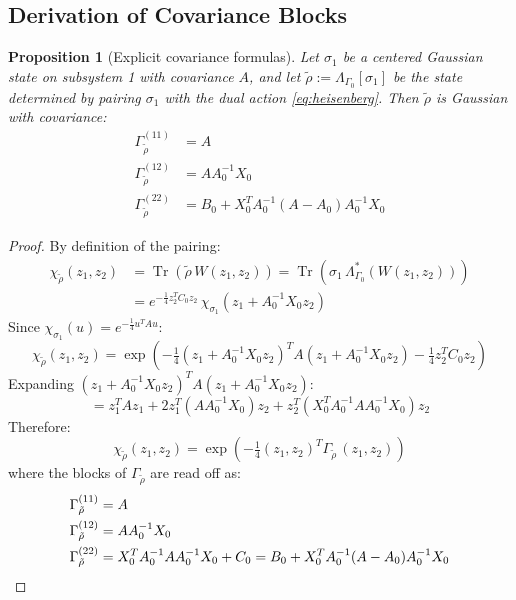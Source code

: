 \documentclass[11pt,a4paper]{article}
\theoremstyle{plain}
\newtheorem{proposition}[theorem]{Proposition}
\theoremstyle{definition}
\theoremstyle{remark}
\newcommand{\Tr}{\operatorname{Tr}}
\begin{document}
\subsection{Derivation of Covariance Blocks}

\begin{proposition}[Explicit covariance formulas]\label{prop:blocks}
Let $\sigma_1$ be a centered Gaussian state on subsystem 1 with covariance $A$,
and let $\tilde{\rho} := \Lambda_{\Gamma_0}[\sigma_1]$ be the state determined by
pairing $\sigma_1$ with the dual action \eqref{eq:heisenberg}. Then
$\tilde{\rho}$ is Gaussian with covariance:
\begin{align}
\Gamma_{\tilde{\rho}}^{(11)} &= A \\
\Gamma_{\tilde{\rho}}^{(12)} &= A A_0^{-1} X_0 \\
\Gamma_{\tilde{\rho}}^{(22)} &= B_0 + X_0^T A_0^{-1}(A - A_0)A_0^{-1} X_0
\end{align}
\end{proposition}

\begin{proof}
By definition of the pairing:
\begin{align}
\chi_{\tilde{\rho}}(z_1, z_2)
&= \Tr\left(\tilde{\rho}\, W(z_1, z_2)\right)
= \Tr\left(\sigma_1\, \Lambda_{\Gamma_0}^*(W(z_1, z_2))\right) \\
&= e^{-\frac{1}{4}z_2^T C_0 z_2}\, \chi_{\sigma_1}(z_1 + A_0^{-1} X_0 z_2)
\end{align}
Since $\chi_{\sigma_1}(u) = e^{-\frac{1}{4}u^T A u}$:
\begin{equation}
\chi_{\tilde{\rho}}(z_1, z_2) = \exp\left(
-\tfrac{1}{4}(z_1 + A_0^{-1}X_0 z_2)^T A (z_1 + A_0^{-1}X_0 z_2)
- \tfrac{1}{4}z_2^T C_0 z_2\right)
\end{equation}
Expanding $(z_1 + A_0^{-1}X_0 z_2)^T A (z_1 + A_0^{-1}X_0 z_2)$:
\begin{equation}
= z_1^T A z_1 + 2 z_1^T (A A_0^{-1}X_0) z_2
+ z_2^T (X_0^T A_0^{-1} A A_0^{-1} X_0) z_2
\end{equation}
Therefore:
\begin{equation}
\chi_{\tilde{\rho}}(z_1, z_2) =
\exp\left(-\tfrac{1}{4}(z_1, z_2)^T \Gamma_{\tilde{\rho}}\,(z_1, z_2)\right)
\end{equation}
where the blocks of $\Gamma_{\tilde{\rho}}$ are read off as:
\begin{align}
\Gamma_{\tilde{\rho}}^{(11)} &= A \\
\Gamma_{\tilde{\rho}}^{(12)} &= A A_0^{-1} X_0 \\
\Gamma_{\tilde{\rho}}^{(22)} &= X_0^T A_0^{-1} A A_0^{-1} X_0 + C_0
= B_0 + X_0^T A_0^{-1}(A - A_0)A_0^{-1} X_0
\qedhere
\end{align}
\end{proof}
\end{document}
